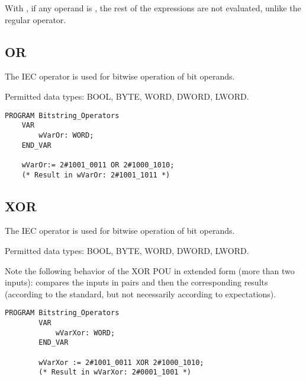 With , if any operand is , the rest of the expressions are not evaluated, unlike the regular  operator.

\subsection{OR} 


The IEC operator is used for bitwise  operation of bit operands.

Permitted data types: BOOL, BYTE, WORD, DWORD, LWORD.

\vspace{15pt}

\begin{lstlisting}[language=ST ]
	PROGRAM Bitstring_Operators
	VAR 
		wVarOr: WORD;
	END_VAR
	
	wVarOr:= 2#1001_0011 OR 2#1000_1010;
	(* Result in wVarOr: 2#1001_1011 *)
\end{lstlisting}	
 

\subsection{XOR} 

	The IEC operator is used for bitwise  operation of bit operands.
	
	Permitted data types: BOOL, BYTE, WORD, DWORD, LWORD. 
	
	Note the following behavior of the XOR POU in extended form (more than two inputs): compares the inputs in pairs and then the corresponding results (according to the standard, but not necessarily according to expectations).
	
	\begin{lstlisting}[language=ST ]
		PROGRAM Bitstring_Operators
		VAR 
			wVarXor: WORD;
		END_VAR
		
		wVarXor := 2#1001_0011 XOR 2#1000_1010;
		(* Result in wVarXor: 2#0001_1001 *)
	\end{lstlisting}



